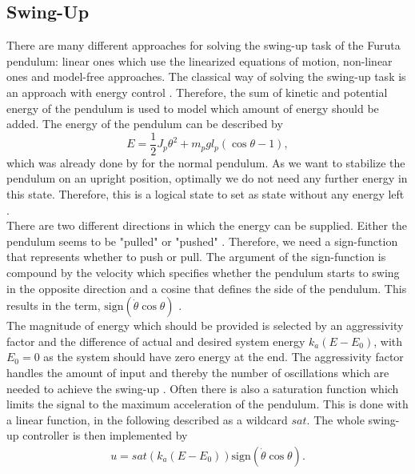 \subsection{Swing-Up}
There are many different approaches for solving the swing-up task of the Furuta 
pendulum: linear ones which use the linearized equations of motion, non-linear 
ones and model-free approaches. The classical way of solving the swing-up task 
is 
an approach with energy control \citep{seman2013swinging}. Therefore, the sum 
of 
kinetic and potential energy of the pendulum is used to model which amount of 
energy should be added. The energy of the pendulum can be described by 
\[E = \frac{1}{2}J_p\theta^2+m_pgl_p(\cos \theta -1),\] which was already done 
by \cite{aastrom2000swinging} for the normal pendulum.
As we want to stabilize the pendulum on an upright position, optimally we do 
not need any further energy in this state. Therefore, this is a logical state 
to set as state without any energy left \citep{seman2013swinging}.\\
There are two different directions in which the 
energy can be supplied. Either the pendulum seems to be "pulled" or "pushed" 
\cite{seman2013swinging}. Therefore, we need a sign-function that represents 
whether to push or pull. The argument of the sign-function is compound by the 
velocity which specifies whether the pendulum starts to swing in the opposite 
direction and a cosine that defines the side of the pendulum. This results in 
the term, $\text{sign}(\dot{\theta}\cos\theta)$ 
\citep{awtar2002inverted}. \\
The magnitude of energy which should be provided is 
selected by an aggressivity factor and the difference of actual and desired 
system energy $k_a(E-E_0)$, with $E_0=0$ as the system should have zero energy 
at the end. The aggressivity factor handles the amount of input 
and thereby the number of oscillations which are needed to achieve the 
swing-up \citep{awtar2002inverted}. Often there is also a saturation function 
which 
limits the signal to the maximum acceleration of the pendulum. This is done 
with a linear function, in the following described as a wildcard $sat$. The 
whole 
swing-up controller is then implemented by 
\begin{align*}
u = sat(k_a(E-E_0))\text{sign}(\dot{\theta}\cos\theta).
\end{align*}
